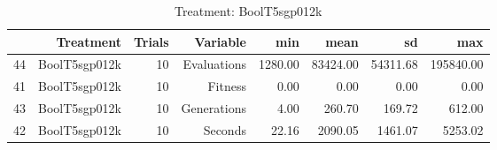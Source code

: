 \begin{table}[ht]
\centering
\begin{tabular}{rrrrrrrr}
  \hline
 & Treatment & Trials & Variable & min & mean & sd & max \\ 
  \hline
44 & BoolT5sgp012k &  10 & Evaluations & 1280.00 & 83424.00 & 54311.68 & 195840.00 \\ 
  41 & BoolT5sgp012k &  10 & Fitness & 0.00 & 0.00 & 0.00 & 0.00 \\ 
  43 & BoolT5sgp012k &  10 & Generations & 4.00 & 260.70 & 169.72 & 612.00 \\ 
  42 & BoolT5sgp012k &  10 & Seconds & 22.16 & 2090.05 & 1461.07 & 5253.02 \\ 
   \hline
\end{tabular}
\caption{Treatment: BoolT5sgp012k} 
\end{table}
